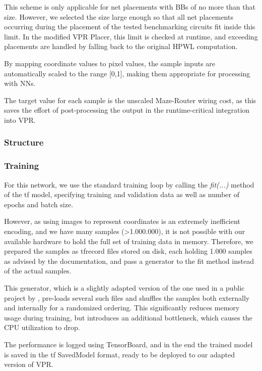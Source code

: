 This scheme is only applicable for net placements with \glspl{BB} of no more than that size. However, we selected the size large enough so that all net placements occurring during the placement of the tested benchmarking circuits fit inside this limit. In the modified \gls{VPR} Placer, this limit is checked at runtime, and exceeding placements are handled by falling back to the original \gls{HPWL} computation.

By mapping coordinate values to pixel values, the sample inputs are automatically scaled to the range [0,1], making them appropriate for processing with \glspl{NN}.

The target value for each sample is the unscaled Maze-Router wiring cost, as this saves the effort of post-processing the output in the runtime-critical integration into \gls{VPR}.\cite{TODO}

\subsubsection{Structure}

\subsubsection{Training}

For this network, we use the standard training loop by calling the \textit{fit(...)} method of the \gls{tf} model, specifying training and validation data as well as number of epochs and batch size.

However, as using images to represent coordinates is an extremely inefficient encoding, and we have many samples (>1.000.000), it is not possible with our available hardware to hold the full set of training data in memory. Therefore, we prepared the samples as tfrecord files stored on disk, each holding 1.000 samples as advised by the documentation\cite{TODO}, and pass a generator to the fit method instead of the actual samples.

This generator, which is a slightly adapted version of the one used in a public project by \cite{TODO}, pre-loads several such files and shuffles the samples both externally and internally for a randomized ordering. This significantly reduces memory usage during training, but introduces an additional bottleneck, which causes the CPU utilization to drop.

The performance is logged using TensorBoard\cite{TODO}, and in the end the trained model is saved in the \gls{tf} SavedModel format\cite{TODO}, ready to be deployed to our adapted version of \gls{VPR}.


